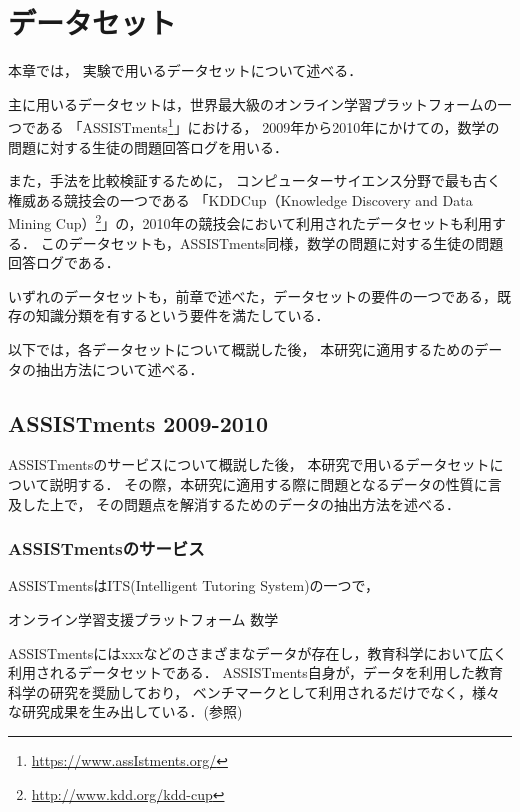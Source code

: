 \chapter{データセット}
\label{chap:dataset}
\fancyhf{}
\rhead{\thepage}
\cfoot{\thepage}


本章では，
実験で用いるデータセットについて述べる．

主に用いるデータセットは，世界最大級のオンライン学習プラットフォームの一つである
「ASSISTments\footnote{\url{https://www.assIstments.org/}}」における，
2009年から2010年にかけての，数学の問題に対する生徒の問題回答ログを用いる．

また，手法を比較検証するために，
コンピューターサイエンス分野で最も古く権威ある競技会の一つである
「KDDCup（Knowledge Discovery and Data Mining Cup）\footnote{\url{http://www.kdd.org/kdd-cup}}」の，2010年の競技会において利用されたデータセットも利用する．
このデータセットも，ASSISTments同様，数学の問題に対する生徒の問題回答ログである．

いずれのデータセットも，前章で述べた，データセットの要件の一つである，既存の知識分類を有するという要件を満たしている．


以下では，各データセットについて概説した後，
本研究に適用するためのデータの抽出方法について述べる．


\section{ASSISTments 2009-2010}
ASSISTmentsのサービスについて概説した後，
本研究で用いるデータセットについて説明する．
その際，本研究に適用する際に問題となるデータの性質に言及した上で，
その問題点を解消するためのデータの抽出方法を述べる．

\subsection{ASSISTmentsのサービス}
ASSISTmentsはITS(Intelligent Tutoring System)の一つで，

オンライン学習支援プラットフォーム
数学

ASSISTmentsにはxxxなどのさまざまなデータが存在し，教育科学において広く利用されるデータセットである．
ASSISTments自身が，データを利用した教育科学の研究を奨励しており，
ベンチマークとして利用されるだけでなく，様々な研究成果を生み出している．(参照)


